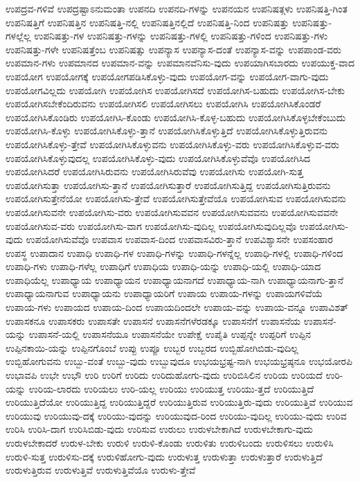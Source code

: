 {ಉಪದ್ರವ-ಗಳಿವೆ
ಉಪದ್ರಷ್ಟಾಽನುಮಂತಾ
ಉಪನದಿ
ಉಪನದಿ-ಗಳನ್ನು
ಉಪನಯನ
ಉಪನಿಷತ್ಗಳು
ಉಪನಿಷತ್ತಿ-ಗಿಂತ
ಉಪನಿಷತ್ತಿಗೆ
ಉಪನಿಷತ್ತಿನ
ಉಪನಿಷತ್ತಿ-ನಲ್ಲಿ
ಉಪನಿಷತ್ತಿನಲ್ಲಿದೆ
ಉಪನಿಷತ್ತಿ-ನಿಂದ
ಉಪನಿಷತ್ತು
ಉಪನಿಷತ್ತು-ಗಳಲ್ಲೆಲ್ಲ
ಉಪನಿಷತ್ತು-ಗಳ
ಉಪನಿಷತ್ತು-ಗಳನ್ನು
ಉಪನಿಷತ್ತು-ಗಳಲ್ಲಿ
ಉಪನಿಷತ್ತು-ಗಳಿಂದ
ಉಪನಿಷತ್ತು-ಗಳು
ಉಪನಿಷತ್ತು-ಗಳೇ
ಉಪನಿಷತ್ತೆಂಬ
ಉಪನಿಷತ್ಸು
ಉಪನ್ಯಾಸ
ಉಪನ್ಯಾಸ-ದಂತೆ
ಉಪನ್ಯಾಸ-ವನ್ನು
ಉಪಪಾಂಡ-ವರು
ಉಪಮಾನ-ಗಳು
ಉಪಮಾನದ
ಉಪಮಾನ-ವನ್ನು
ಉಪಮಾನವೆನಿಸು-ವುದು
ಉಪಯಾಗಿಸಬಾರದು
ಉಪಯುಕ್ತ-ವಾದ
ಉಪಯೋಗ
ಉಪಯೋಗಕ್ಕೆ
ಉಪಯೋಗಪಡಿಸಿಕೊಳ್ಳು-ವುದು
ಉಪಯೋಗ-ವನ್ನು
ಉಪಯೋಗ-ವಾಗು-ವುದು
ಉಪಯೋಗವಿಲ್ಲದು
ಉಪಯೋಗಿ
ಉಪಯೋಗಿಸ
ಉಪಯೋಗಿಸದೆ
ಉಪಯೋಗಿಸ-ಬಹುದು
ಉಪಯೋಗಿಸ-ಬೇಕು
ಉಪಯೋಗಿಸಬೇಕೆಂದಿರುವನು
ಉಪಯೋಗಿಸಲಿ
ಉಪಯೋಗಿಸಲು
ಉಪಯೋಗಿಸಿ
ಉಪಯೋಗಿಸಿಕೊಂಡರೆ
ಉಪಯೋಗಿಸಿಕೊಂಡಿರು
ಉಪಯೋಗಿಸಿ-ಕೊಂಡು
ಉಪಯೋಗಿಸಿ-ಕೊಳ್ಳ-ಬಹುದು
ಉಪಯೋಗಿಸಿಕೊಳ್ಳಬೇಕೆಂಬುದು
ಉಪಯೋಗಿಸಿ-ಕೊಳ್ಳು
ಉಪಯೋಗಿಸಿಕೊಳ್ಳು-ತ್ತಾನೆ
ಉಪಯೋಗಿಸಿಕೊಳ್ಳುತ್ತಿದೆ
ಉಪಯೋಗಿಸಿಕೊಳ್ಳುತ್ತಿರುವನು
ಉಪಯೋಗಿಸಿಕೊಳ್ಳು-ತ್ತೇವೆ
ಉಪಯೋಗಿಸಿಕೊಳ್ಳುವನು
ಉಪಯೋಗಿಸಿಕೊಳ್ಳು-ವರು
ಉಪಯೋಗಿಸಿಕೊಳ್ಳುವ-ವರು
ಉಪಯೋಗಿಸಿಕೊಳ್ಳುವುದಲ್ಲ
ಉಪಯೋಗಿಸಿಕೊಳ್ಳು-ವುದು
ಉಪಯೋಗಿಸಿಕೊಳ್ಳುವೆವೊ
ಉಪಯೋಗಿಸಿದ
ಉಪಯೋಗಿಸಿದರೆ
ಉಪಯೋಗಿಸಿರುವನು
ಉಪಯೋಗಿಸಿರುವೆವು
ಉಪಯೋಗಿಸು
ಉಪಯೋಗಿ-ಸುತ್ತ
ಉಪಯೋಗಿಸುತ್ತಾ
ಉಪಯೋಗಿಸು-ತ್ತಾನೆ
ಉಪಯೋಗಿಸುತ್ತಾರೆ
ಉಪಯೋಗಿಸುತ್ತಿದ್ದ
ಉಪಯೋಗಿಸುತ್ತಿರುವನು
ಉಪಯೋಗಿಸುತ್ತೇನೆಯೋ
ಉಪಯೋಗಿಸು-ತ್ತೇವೆ
ಉಪಯೋಗಿಸುತ್ತೇವೆಯೊ
ಉಪಯೋಗಿಸುವ
ಉಪಯೋಗಿಸುವನು
ಉಪಯೋಗಿಸುವನೇ
ಉಪಯೋಗಿಸು-ವರು
ಉಪಯೋಗಿಸುವವನ
ಉಪಯೋಗಿಸುವವನು
ಉಪಯೋಗಿಸುವವನೇ
ಉಪಯೋಗಿಸುವ-ವರು
ಉಪಯೋಗಿಸು-ವಾಗ
ಉಪಯೋಗಿಸು-ವುದಿಲ್ಲ
ಉಪಯೋಗಿಸುವುದಿಲ್ಲವೊ
ಉಪಯೋಗಿಸು-ವುದು
ಉಪಯೋಗಿಸುವೆವೊ
ಉಪವಾಸ
ಉಪವಾಸ-ದಿಂದ
ಉಪವಾಸವಿರು-ತ್ತಾನೆ
ಉಪವಿಶ್ಯಾಸನೇ
ಉಪಸಂಹಾರ
ಉಪಸ್ಥ
ಉಪಾದಾನ
ಉಪಾಧಿ
ಉಪಾಧಿ-ಗಳ
ಉಪಾಧಿ-ಗಳನ್ನು
ಉಪಾಧಿ-ಗಳನ್ನೆಲ್ಲ
ಉಪಾಧಿ-ಗಳಲ್ಲಿ
ಉಪಾಧಿ-ಗಳಿಂದ
ಉಪಾಧಿ-ಗಳು
ಉಪಾಧಿ-ಗಳೆಲ್ಲ
ಉಪಾಧಿಗೆ
ಉಪಾಧಿಯ
ಉಪಾಧಿ-ಯನ್ನು
ಉಪಾಧಿ-ಯಲ್ಲಿ
ಉಪಾಧಿ-ಯಾದ
ಉಪಾಧಿಯೆಲ್ಲ
ಉಪಾಧ್ಯಾಯ
ಉಪಾಧ್ಯಾಯನ
ಉಪಾಧ್ಯಾಯನಾಗದೆ
ಉಪಾಧ್ಯಾಯ-ನಾಗಿ
ಉಪಾಧ್ಯಾಯನಾಗು-ತ್ತಾನೆ
ಉಪಾಧ್ಯಾಯನಾಗುವ
ಉಪಾಧ್ಯಾಯನು
ಉಪಾಧ್ಯಾಯರಿಗೆ
ಉಪಾಯ
ಉಪಾಯ-ಗಳನ್ನು
ಉಪಾಯಗಳಿವೆಯೆ
ಉಪಾಯ-ಗಳು
ಉಪಾಯದ
ಉಪಾಯ-ದಿಂದ
ಉಪಾಯದಿಂದಲೇ
ಉಪಾಯ-ವನ್ನು
ಉಪಾಯ-ವನ್ನೂ
ಉಪಾವಿಶತ್
ಉಪಾಸಕನೂ
ಉಪಾಸಕರು
ಉಪಾಸತೇ
ಉಪಾಸನೆ
ಉಪಾಸನೆಗಳೆರಡಕ್ಕೂ
ಉಪಾಸನೆಗೆ
ಉಪಾಸನೆಯ
ಉಪಾಸನೆ-ಯನ್ನು
ಉಪಾಸನೆ-ಯಲ್ಲಿ
ಉಪಾಸನೆಯೂ
ಉಪಾಸನೆಯೇ
ಉಪೇಕ್ಷೆ
ಉಪೈತಿ
ಉಪ್ಪನ್ನೇ
ಉಪ್ಪರಿಗೆ
ಉಪ್ಪಿನ
ಉಪ್ಪಿನಕಾಯಿ-ಯನ್ನು
ಉಪ್ಪಿನಗೊಂಬೆ
ಉಪ್ಪು
ಉಪ್ಪೂ
ಉಬ್ಬರ
ಉಬ್ಬರದ
ಉಬ್ಬಿಹೋಗಿಬಿಡು-ವುದಿಲ್ಲ
ಉಬ್ಬಿಹೋಗುವನು
ಉಬ್ಬು-ವಂತೆ
ಉಬ್ಬು-ವುದು
ಉಬ್ಬುವುದೂ
ಉಭಯಭ್ರಷ್ಟ-ನಾಗಿ
ಉಭಯಭ್ರಷ್ಠನೂ
ಉಭಯೋರಪಿ
ಉಭಾವಪಿ
ಉಭೇ
ಉಭೌ
ಉರಿ
ಉರಿಗೆ
ಉರಿದು
ಉರಿದುಹೋಗು-ವುದು
ಉರಿಬಿಸಿಲಿನ
ಉರಿಯ
ಉರಿಯದೆ
ಉರಿ-ಯನ್ನು
ಉರಿಯ-ಲಾರದು
ಉರಿಯಲು
ಉರಿ-ಯಲ್ಲ
ಉರಿಯು
ಉರಿಯುತ್ತ
ಉರಿಯು-ತ್ತದೆ
ಉರಿಯುತ್ತಿದೆ
ಉರಿಯುತ್ತಿದೆಯೋ
ಉರಿಯುತ್ತಿದ್ದ
ಉರಿಯುತ್ತಿದ್ದರೆ
ಉರಿಯುತ್ತಿರುವ
ಉರಿಯುತ್ತಿರು-ವುದು
ಉರಿಯುತ್ತಿವೆ
ಉರಿಯುವ
ಉರಿಯುವು
ಉರಿಯುವು-ದಕ್ಕೆ
ಉರಿಯು-ವುದನ್ನು
ಉರಿಯುವುದ-ರಿಂದ
ಉರಿಯು-ವುದಿಲ್ಲ
ಉರಿಯು-ವುದು
ಉರಿವ
ಉರಿಸಿ
ಉರಿಸಿ-ದಾಗ
ಉರಿಸಿಬಿಡು-ವುದು
ಉರಿಸುವ
ಉರುಲು
ಉರುಳಬೇಕಾಗಿದೆ
ಉರುಳಬೇಕಾಗು-ವುದು
ಉರುಳಬೇಕಾದರೆ
ಉರುಳ-ಬೇಕು
ಉರುಳಿ
ಉರುಳಿ-ಕೊಂಡು
ಉರುಳಿತು
ಉರುಳಿಬಂದು
ಉರುಳಿಸಲು
ಉರುಳಿಸಿ
ಉರುಳಿ-ಸುತ್ತ
ಉರುಳಿಸು-ದಕ್ಕೆ
ಉರುಳಿಹೋಗು-ವುದು
ಉರುಳುತ್ತ
ಉರುಳುತ್ತಾ
ಉರುಳುತ್ತಾರೆ
ಉರುಳುತ್ತಿದೆ
ಉರುಳುತ್ತಿರುವ
ಉರುಳುತ್ತಿವೆ
ಉರುಳುತ್ತಿವೆಯೊ
ಉರುಳು-ತ್ತೇವೆ
}
